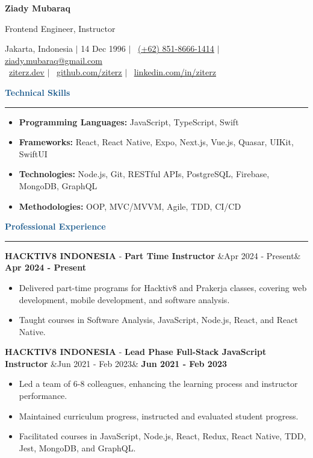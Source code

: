 \documentclass{article}
\newcommand{\header}[1]{
	\vspace{2mm}
	{\large \noindent \textcolor[HTML]{19598C}{\textbf{#1}}}
	\vspace{0.5mm}
	\hrule
	\vspace{1.5mm}
}
\newcommand{\skillsheader}[1]{
	\vspace{2mm}
	{\large \noindent \textcolor[HTML]{19598C}{\textbf{#1}}}
	\vspace{1.5mm}
	\hrule
	\vspace{1.5mm}
}
\newcommand{\longitem}[4]{
	\begin{adjustwidth}{}{}
		\MakeUppercase{\textbf{#1}} - \textbf{#3} \hfill \ifx&#2& \else \textbf{#2} \fi \\
	\end{adjustwidth}
	\vspace{-1mm}
}
\newcommand{\skills}[1]{%
	\begin{itemize}[leftmargin=*]\leftskip=0.5em
		\setlength\itemsep{-1mm}
		\vspace{-1mm}
		#1
	\end{itemize}%
}
\newcommand{\liststart}{\begin{itemize}[leftmargin=*]\leftskip=0.5em\vspace{-5mm}}
\newcommand{\listend}{\end{itemize}\vspace{0.2mm}}
\begin{document}
	\begin{flushleft}
		{\LARGE \textbf{Ziady Mubaraq}} \\

		\vspace{1mm}

		{\large Frontend Engineer, Instructor}

		\vspace{1mm}
		
		Jakarta, Indonesia  $\mid$ 14 Dec 1996 $\mid$ \faWhatsapp ~\href{https://wa.me/6285186661414}{\underline{(+62) 851-8666-1414}} $\mid$ \faEnvelope[regular] \href{mailto:ziady.mubaraq@gmail.com}{\underline{ziady.mubaraq@gmail.com}} \\
		\faLink ~\href{https://ziterz.dev}{\underline{ziterz.dev}}  $\mid$ \faGithub ~\href{https://github.com/ziterz}{\underline{github.com/ziterz}} $\mid$ \faLinkedin ~\href{https://linkedin.com/in/ziterz}{\underline{linkedin.com/in/ziterz}}
	\end{flushleft}

	\vspace{-1mm}

	\skillsheader{Technical Skills}
	\skills{
		\item \textbf{Programming Languages:} JavaScript, TypeScript, Swift
		\item \textbf{Frameworks:} React, React Native, Expo, Next.js, Vue.js, Quasar, UIKit, SwiftUI
		\item \textbf{Technologies:} Node.js, Git, RESTful APIs, PostgreSQL, Firebase, MongoDB, GraphQL
		\item \textbf{Methodologies:} OOP, MVC/MVVM, Agile, TDD, CI/CD
	}		

	\header{Professional Experience}
		\longitem{Hacktiv8 Indonesia}{Apr 2024 - Present}{Part Time Instructor}{}
		\liststart
			\item Delivered part-time programs for Hacktiv8 and Prakerja classes, covering web development, mobile development, and software analysis. \vspace{-1mm}
			\item Taught courses in Software Analysis, JavaScript, Node.js, React, and React Native.
		\listend

		\longitem{Hacktiv8 Indonesia}{Jun 2021 - Feb 2023}{Lead Phase Full-Stack JavaScript Instructor}{}
		\liststart
			\item Led a team of 6-8 colleagues, enhancing the learning process and instructor performance. \vspace{-1mm}
			\item Maintained curriculum progress, instructed and evaluated student progress. \vspace{-1mm}
			\item Facilitated courses in JavaScript, Node.js, React, Redux, React Native, TDD, Jest, MongoDB, and GraphQL.
		\listend
\end{document}
